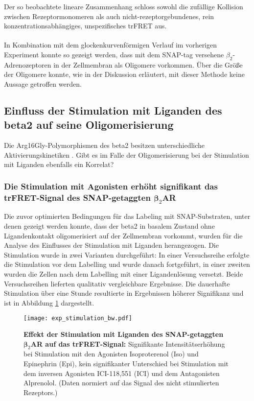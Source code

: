 Der so beobachtete lineare Zusammenhang schloss sowohl die zufällige Kollision zwischen Rezeptormonomeren als auch nicht-rezeptorgebundenes, rein konzentrationsabhängiges, unspezifisches trFRET aus.
\\ \\
In Kombination mit dem glockenkurvenförmigen Verlauf im vorherigen Experiment konnte so gezeigt werden, dass mit dem SNAP-tag versehene $\beta_2$-Adrenozeptoren in der Zellmembran als Oligomere vorkommen. Über die Größe der Oligomere konnte, wie in der Diskussion erläutert, mit dieser Methode keine Aussage getroffen werden. 

\subsection{Einfluss der Stimulation mit Liganden des \gls{beta2} auf seine Oligomerisierung}
\label{res:stimulation}
Die Arg16Gly-Polymorphismen des \gls{beta2} besitzen unterschiedliche Aktivierungskinetiken \parencite{Ahles2011}. Gibt es im Falle der Oligomerisierung bei der Stimulation mit Liganden ebenfalls ein Korrelat? 
 
\subsubsection{Die Stimulation mit Agonisten erhöht signifikant das trFRET-Signal des SNAP-getaggten $\boldsymbol\beta_2$AR}

Die zuvor optimierten Bedingungen für das Labeling mit SNAP-Substraten, unter denen gezeigt werden konnte, dass der \gls{beta2} in basalem Zustand ohne Ligandenkontakt oligomerisiert auf der Zellmembran vorkommt, wurden für die Analyse des Einflusses der Stimulation mit Liganden herangezogen. Die Stimulation wurde in zwei Varianten durchgeführt: In einer Versuchsreihe erfolgte die Stimulation vor dem Labelling und wurde danach fortgeführt, in einer zweiten wurden die Zellen nach dem Labelling mit einer Ligandenlösung versetzt. Beide Versuchsreihen lieferten qualitativ vergleichbare Ergebnisse. Die dauerhafte Stimulation über eine Stunde resultierte in Ergebnissen höherer Signifikanz und ist in Abbildung \ref{fig:stimulation} dargestellt.

\begin{figure}[htbp]
	\centering
    \texttt{[image: exp\_stimulation\_bw.pdf]}
    \caption{\textbf{Effekt der Stimulation mit Liganden des SNAP-getaggten $\boldsymbol\beta_2$AR auf das trFRET-Signal:} Signifikante Intensitätserhöhung bei Stimulation mit den Agonisten Isoproterenol (Iso) und Epinephrin (Epi), kein signifikanter Unterschied bei Stimulation mit dem inversen Agonisten ICI-118,551 (ICI) und dem Antagonisten Alprenolol. (Daten normiert auf das Signal des nicht stimulierten Rezeptors.)} 
    \label{fig:stimulation}
\end{figure}

